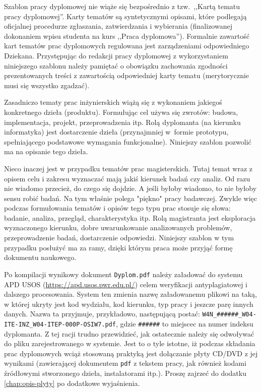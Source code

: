 Szablon pracy dyplomowej nie wiąże się bezpośrednio z tzw.\ ,,Kartą tematu pracy dyplomowej''. Karty tematów są syntetycznymi opisami, które podlegają oficjalnej procedurze zgłaszania, zatwierdzania i wybierania (finalizowanej dokonaniem wpisu studenta na kurs ,,Praca dyplomowa''). Formalnie zawartość kart tematów prac dyplomowych regulowana jest zarządzeniami odpowiedniego Dziekana. Przystępując do redakcji pracy dyplomowej z wykorzystaniem niniejszego szablonu należy pamiętać o obowiązku zachowania zgodności prezentowanych treści z zawartością odpowiedniej karty tematu (merytorycznie musi się wszystko zgadzać).

Zasadniczo tematy prac inżynierskich wiążą się z wykonaniem jakiegoś konkretnego dzieła (produktu). Formułując cel używa się zwrotów:
budowa, implementacja, projekt, przeprowadzenia itp. Rolą dyplomanta (na kierunku informatyka) jest dostarczenie dzieła (przynajmniej w~formie prototypu, spełniającego podstawowe wymagania funkcjonalne). Niniejszy szablon pozwolić ma na opisanie tego dzieła.

Nieco inaczej jest w przypadku tematów prac magisterskich. Tutaj temat wraz z opisem celu i zakresu wyznaczać mają jakiś kierunek badań czy analiz. Od razu nie wiadomo przecież, do czego się dojdzie. A jeśli byłoby wiadomo, to nie byłoby sensu robić badań.  Na tym właśnie polega "piękno" pracy badawczej. 
Zwykle więc podczas formułowania tematów i opisów tego typu prac stosuje się słowa: badanie, analiza, przegląd, charakterystyka itp. Rolą magistranta jest eksploracja wyznaczonego kierunku, dobre uwarunkowanie analizowanych problemów, przeprowadzenie badań, dostarczenie odpowiedzi. Niniejszy szablon w tym przypadku posłużyć ma za ramy, dzięki którym praca może przyjąć formę dokumentu naukowego.

Po kompilacji wynikowy dokument \texttt{Dyplom.pdf} należy załadować do systemu APD USOS (\url{https://apd.usos.pwr.edu.pl/}) celem weryfikacji antyplagiatowej i dalszego procesowania. System ten zmienia nazwę załadowanemu plikowi na taką, w której ukryty jest kod wydziału, kod kierunku, typ pracy i jeszcze parę innych danych. Nazwa ta przyjmuje, przykładowo, następującą postać: \texttt{W4N\_\#\#\#\#\#\#\_W04-ITE-INZ\_W04-ITEP-000P-OSIW7.pdf}, gdzie \texttt{\#\#\#\#\#\#} to miejscec na numer indeksu dyplomanta. Z tej racji trudno przewidzieć, jak ostatecznie należy się odwoływać do pliku zarejestrowanego w systemie. Jest to o tyle istotne, iż podczas składania prac dyplomowych wciąż stosowaną praktyką jest dołączanie płyty CD/DVD z jej wynikami (zawierającej dokumentem \texttt{pdf} z tekstem pracy, jak również kodami źródłowymi stworzonego dzieła, instalatorami itp.). Proszę zajrzeć do dodatku \ref{chap:opis-plyty} po dodatkowe wyjaśnienia.

